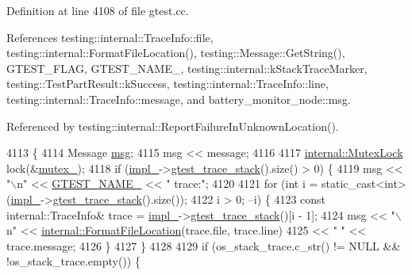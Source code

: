 Definition at line 4108 of file gtest.\+cc.



References testing\+::internal\+::\+Trace\+Info\+::file, testing\+::internal\+::\+Format\+File\+Location(), testing\+::\+Message\+::\+Get\+String(), G\+T\+E\+S\+T\+\_\+\+F\+L\+AG, G\+T\+E\+S\+T\+\_\+\+N\+A\+M\+E\+\_\+, testing\+::internal\+::k\+Stack\+Trace\+Marker, testing\+::\+Test\+Part\+Result\+::k\+Success, testing\+::internal\+::\+Trace\+Info\+::line, testing\+::internal\+::\+Trace\+Info\+::message, and battery\+\_\+monitor\+\_\+node\+::msg.



Referenced by testing\+::internal\+::\+Report\+Failure\+In\+Unknown\+Location().


\begin{DoxyCode}
4113                                                                   \{
4114   Message \hyperlink{namespacebattery__monitor__node_ab1920c64448816edd4064e494275fdff}{msg};
4115   msg << message;
4116 
4117   \hyperlink{namespacetesting_1_1internal_a08b187c6cc4e28400aadf9a32fccc8de}{internal::MutexLock} lock(&\hyperlink{classtesting_1_1UnitTest_abb94ef45cf0ab43be81ac6d5b1364132}{mutex\_});
4118   \textcolor{keywordflow}{if} (\hyperlink{classtesting_1_1UnitTest_a834685f92009d21b21a7307f4cbfb6e5}{impl\_}->\hyperlink{classtesting_1_1internal_1_1UnitTestImpl_af8c7c0a0c954e36d83e6e4690d3fb938}{gtest\_trace\_stack}().size() > 0) \{
4119     msg << \textcolor{stringliteral}{"\(\backslash\)n"} << \hyperlink{gtest-port_8h_a13d98c217176bd8722c395b9225fc19d}{GTEST\_NAME\_} << \textcolor{stringliteral}{" trace:"};
4120 
4121     \textcolor{keywordflow}{for} (\textcolor{keywordtype}{int} i = static\_cast<int>(\hyperlink{classtesting_1_1UnitTest_a834685f92009d21b21a7307f4cbfb6e5}{impl\_}->\hyperlink{classtesting_1_1internal_1_1UnitTestImpl_af8c7c0a0c954e36d83e6e4690d3fb938}{gtest\_trace\_stack}().size());
4122          i > 0; --i) \{
4123       \textcolor{keyword}{const} internal::TraceInfo& trace = \hyperlink{classtesting_1_1UnitTest_a834685f92009d21b21a7307f4cbfb6e5}{impl\_}->\hyperlink{classtesting_1_1internal_1_1UnitTestImpl_af8c7c0a0c954e36d83e6e4690d3fb938}{gtest\_trace\_stack}()[i - 1];
4124       msg << \textcolor{stringliteral}{"\(\backslash\)n"} << \hyperlink{namespacetesting_1_1internal_a31b7c3abed4a7c395f42c61e993989f4}{internal::FormatFileLocation}(trace.file, trace.line)
4125           << \textcolor{stringliteral}{" "} << trace.message;
4126     \}
4127   \}
4128 
4129   \textcolor{keywordflow}{if} (os\_stack\_trace.c\_str() != NULL && !os\_stack\_trace.empty()) \{

\end{DoxyCode}
